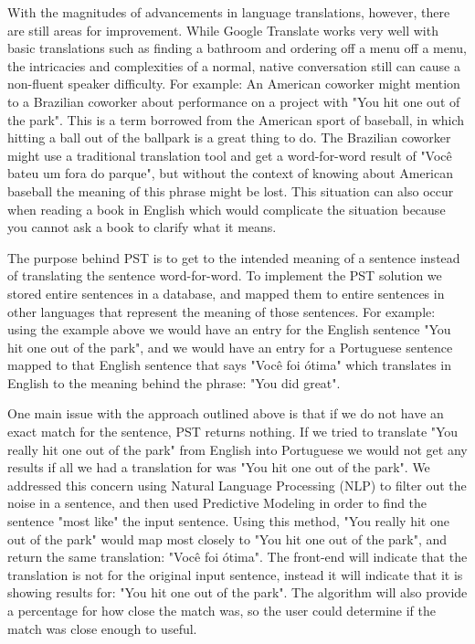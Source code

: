 \documentclass[runningheads]{llncs}
\begin{document}
	With the magnitudes of advancements in language translations, however, there are still areas for improvement. While Google Translate works very well with basic translations such as finding a bathroom and ordering off a menu off a menu, the intricacies and complexities of a normal, native conversation still can cause a non-fluent speaker difficulty. For example: An American coworker might mention to a Brazilian coworker about performance on a project with "You hit one out of the park". This is a term borrowed from the American sport of baseball, in which hitting a ball out of the ballpark is a great thing to do. The Brazilian coworker might use a traditional translation tool and get a word-for-word result of "Você bateu um fora do parque", but without the context of knowing about American baseball the meaning of this phrase might be lost. This situation can also occur when reading a book in English which would complicate the situation because you cannot ask a book to clarify what it means.
	
	The purpose behind PST is to get to the intended meaning of a sentence instead of translating the sentence word-for-word. To implement the PST solution we stored entire sentences in a database, and mapped them to entire sentences in other languages that represent the meaning of those sentences. For example: using the example above we would have an entry for the English sentence "You hit one out of the park", and we would have an entry for a Portuguese sentence mapped to that English sentence that says "Você foi ótima" which translates in English to the meaning behind the phrase: "You did great". 

	One main issue with the approach outlined above is that if we do not have an exact match for the sentence, PST returns nothing. If we tried to translate "You really hit one out of the park" from English into Portuguese we would not get any results if all we had a translation for was "You hit one out of the park". We  addressed this concern using Natural Language Processing (NLP) to filter out the noise in a sentence, and then used Predictive Modeling in order to find the sentence "most like" the input sentence. Using this method, "You really hit one out of the park" would map most closely to "You hit one out of the park", and return the same translation: "Você foi ótima". The front-end will indicate that the translation is not for the original input sentence, instead it will indicate that it is showing results for: "You hit one out of the park". The algorithm will also provide a percentage for how close the match was, so the user could determine if the match was close enough to useful.
	
\end{document}
